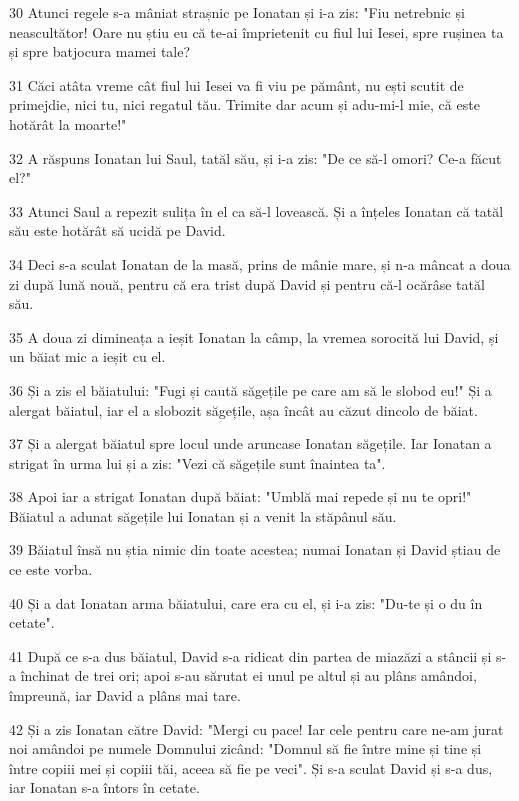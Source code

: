 \par 30 Atunci regele s-a mâniat strașnic pe Ionatan și i-a zis: "Fiu netrebnic și neascultător! Oare nu știu eu că te-ai împrietenit cu fiul lui Iesei, spre rușinea ta și spre batjocura mamei tale?
\par 31 Căci atâta vreme cât fiul lui Iesei va fi viu pe pământ, nu ești scutit de primejdie, nici tu, nici regatul tău. Trimite dar acum și adu-mi-l mie, că este hotărât la moarte!"
\par 32 A răspuns Ionatan lui Saul, tatăl său, și i-a zis: "De ce să-l omori? Ce-a făcut el?"
\par 33 Atunci Saul a repezit sulița în el ca să-l lovească. Și a înțeles Ionatan că tatăl său este hotărât să ucidă pe David.
\par 34 Deci s-a sculat Ionatan de la masă, prins de mânie mare, și n-a mâncat a doua zi după lună nouă, pentru că era trist după David și pentru că-l ocărâse tatăl său.
\par 35 A doua zi dimineața a ieșit Ionatan la câmp, la vremea sorocită lui David, și un băiat mic a ieșit cu el.
\par 36 Și a zis el băiatului: "Fugi și caută săgețile pe care am să le slobod eu!" Și a alergat băiatul, iar el a slobozit săgețile, așa încât au căzut dincolo de băiat.
\par 37 Și a alergat băiatul spre locul unde aruncase Ionatan săgețile. Iar Ionatan a strigat în urma lui și a zis: "Vezi că săgețile sunt înaintea ta".
\par 38 Apoi iar a strigat Ionatan după băiat: "Umblă mai repede și nu te opri!" Băiatul a adunat săgețile lui Ionatan și a venit la stăpânul său.
\par 39 Băiatul însă nu știa nimic din toate acestea; numai Ionatan și David știau de ce este vorba.
\par 40 Și a dat Ionatan arma băiatului, care era cu el, și i-a zis: "Du-te și o du în cetate".
\par 41 După ce s-a dus băiatul, David s-a ridicat din partea de miazăzi a stâncii și s-a închinat de trei ori; apoi s-au sărutat ei unul pe altul și au plâns amândoi, împreună, iar David a plâns mai tare.
\par 42 Și a zis Ionatan către David: "Mergi cu pace! Iar cele pentru care ne-am jurat noi amândoi pe numele Domnului zicând: "Domnul să fie între mine și tine și între copiii mei și copiii tăi, aceea să fie pe veci". Și s-a sculat David și s-a dus, iar Ionatan s-a întors în cetate.

